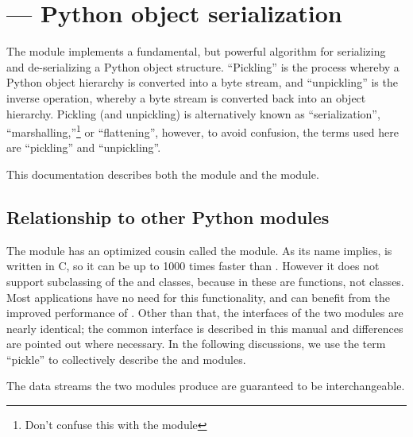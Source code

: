 \section{ --- Python object serialization}



The  module implements a fundamental, but powerful
algorithm for serializing and de-serializing a Python object
structure.  ``Pickling'' is the process whereby a Python object
hierarchy is converted into a byte stream, and ``unpickling'' is the
inverse operation, whereby a byte stream is converted back into an
object hierarchy.  Pickling (and unpickling) is alternatively known as
``serialization'', ``marshalling,''\footnote{Don't confuse this with
the  module} or ``flattening'',
however, to avoid confusion, the terms used here are ``pickling'' and
``unpickling''.

This documentation describes both the  module and the 
 module.

\subsection{Relationship to other Python modules}

The  module has an optimized cousin called the
 module.  As its name implies,  is
written in C, so it can be up to 1000 times faster than
.  However it does not support subclassing of the
 and  classes, because in
 these are functions, not classes.  Most applications
have no need for this functionality, and can benefit from the improved
performance of .  Other than that, the interfaces of
the two modules are nearly identical; the common interface is
described in this manual and differences are pointed out where
necessary.  In the following discussions, we use the term ``pickle''
to collectively describe the  and
 modules.

The data streams the two modules produce are guaranteed to be
interchangeable.

